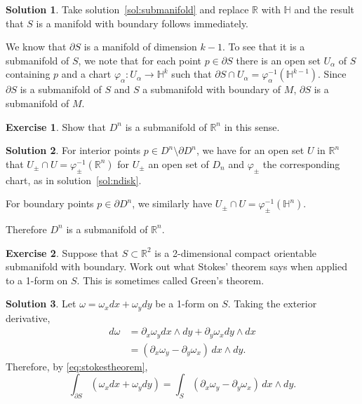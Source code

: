 \documentclass[11pt, a4paper]{report}
\theoremstyle{definition}
\newtheorem{ex}{Exercise}[part]
\newtheorem{sol}{Solution}[part]
\begin{document}
\begin{sol}

Take solution~\ref{sol:submanifold} and replace $\mathbb{R}$ with $\mathbb{H}$ and the result that $S$ is a manifold with boundary follows immediately.

We know that $\partial S$ is a manifold of dimension $k - 1$. To see that it is a submanifold of $S$, we note that for each point $p \in \partial S$ there is an open set $U_\alpha$ of $S$ containing $p$ and a chart $\varphi_\alpha: U_\alpha \to \mathbb{H}^k$ such that $\partial S \cap U_\alpha = \varphi_\alpha^{-1}(\mathbb{H}^{k - 1})$. Since $\partial S$ is a submanifold of $S$ and $S$ a submanifold with boundary of $M$, $\partial S$ is a submanifold of $M$.

\end{sol}

\begin{ex}

Show that $D^n$ is a submanifold of $\mathbb{R}^n$ in this sense.

\end{ex}

\begin{sol}

For interior points $p \in D^n \setminus \partial D^n$, we have for an open set $U$ in $\mathbb{R}^n$ that $U_\pm \cap U = \varphi_\pm^{-1}(\mathbb{R}^n)$ for $U_\pm$ an open set of $D_n$ and $\varphi_\pm$ the corresponding chart, as in solution~\ref{sol:ndisk}.

For boundary points $p \in \partial D^n$, we similarly have $U_\pm \cap U = \varphi_\pm^{-1}(\mathbb{H}^n)$.

Therefore $D^n$ is a submanifold of $\mathbb{R}^n$.

\end{sol}

\begin{ex}

Suppose that $S \subset \mathbb{R}^2$ is a 2-dimensional compact orientable submanifold with boundary.
Work out what Stokes' theorem says when applied to a 1-form on $S$.
This is sometimes called Green's theorem.

\end{ex}

\begin{sol}

Let $\omega = \omega_x dx + \omega_y dy$ be a 1-form on $S$. Taking the exterior derivative,
\begin{align*}
    d\omega &= \partial_x \omega_y dx \wedge dy + \partial_y \omega_x dy \wedge dx \\
            &= (\partial_x \omega_y - \partial_y \omega_x) \, dx \wedge dy.
\end{align*}
Therefore, by \ref{eq:stokestheorem}, %
\[
    \int_{\partial S} (\omega_x dx + \omega_y dy) =
        \int_S (\partial_x \omega_y - \partial_y \omega_x) \, dx \wedge dy.
\]

\end{sol}
\end{document}
